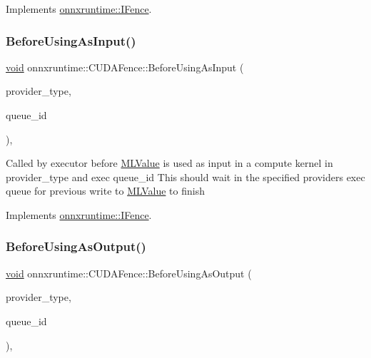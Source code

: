 Implements \mbox{\hyperlink{classonnxruntime_1_1IFence_aa0d10e238e95cd8b7fed01c8c70fa1cd}{onnxruntime\+::\+I\+Fence}}.

\mbox{\label{classonnxruntime_1_1CUDAFence_ae696393f88e06ad9e8c8576f6f306c32}} 
\subsubsection{\texorpdfstring{Before\+Using\+As\+Input()}{BeforeUsingAsInput()}}
{\footnotesize\ttfamily \mbox{\hyperlink{mlasi_8h_a88f941d423cb2a819b70a1358982b1a6}{void}} onnxruntime\+::\+C\+U\+D\+A\+Fence\+::\+Before\+Using\+As\+Input (\begin{DoxyParamCaption}\item[{\mbox{\hyperlink{namespaceonnxruntime_a863e2227cbf32aab76aad35fdadff4bb}{onnxruntime\+::\+Provider\+Type}}}]{provider\+\_\+type,  }\item[{int}]{queue\+\_\+id }\end{DoxyParamCaption})\hspace{0.3cm}{\ttfamily [override]}, {\ttfamily [virtual]}}

Called by executor before \mbox{\hyperlink{classonnxruntime_1_1MLValue}{M\+L\+Value}} is used as input in a compute kernel in provider\+\_\+type and exec queue\+\_\+id This should wait in the specified provider\textquotesingle{}s exec queue for previous write to \mbox{\hyperlink{classonnxruntime_1_1MLValue}{M\+L\+Value}} to finish 

Implements \mbox{\hyperlink{classonnxruntime_1_1IFence_aff95503bc94e36334887b7c8dbc1d14c}{onnxruntime\+::\+I\+Fence}}.

\mbox{\label{classonnxruntime_1_1CUDAFence_a93950e06048ab9d52523beaa5b89d481}} 
\subsubsection{\texorpdfstring{Before\+Using\+As\+Output()}{BeforeUsingAsOutput()}}
{\footnotesize\ttfamily \mbox{\hyperlink{mlasi_8h_a88f941d423cb2a819b70a1358982b1a6}{void}} onnxruntime\+::\+C\+U\+D\+A\+Fence\+::\+Before\+Using\+As\+Output (\begin{DoxyParamCaption}\item[{\mbox{\hyperlink{namespaceonnxruntime_a863e2227cbf32aab76aad35fdadff4bb}{onnxruntime\+::\+Provider\+Type}}}]{provider\+\_\+type,  }\item[{int}]{queue\+\_\+id }\end{DoxyParamCaption})\hspace{0.3cm}{\ttfamily [override]}, {\ttfamily [virtual]}}

